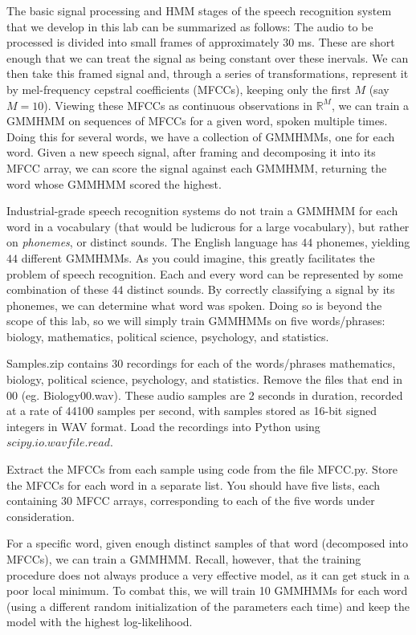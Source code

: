 The basic signal processing and HMM stages of the speech recognition system that we develop in this lab can be summarized as follows:
The audio to be processed is divided into small frames of approximately $30$ ms. These are short enough that we can treat the signal as being constant over these inervals. We can then take this framed signal and, through a series of transformations, represent it by mel-frequency cepstral coefficients (MFCCs), keeping only the first $M$ (say $M = 10$). Viewing these MFCCs as continuous observations in $\mathbb{R}^{M}$, we can train a GMMHMM on sequences of MFCCs for a given word, spoken multiple times. Doing this for several words, we have a collection of GMMHMMs, one for each word. Given a new speech signal, after framing and decomposing it into its MFCC array, we can score the signal against each GMMHMM, returning the word whose GMMHMM scored the highest.

Industrial-grade speech recognition systems do not train a GMMHMM for each word in a vocabulary (that would be ludicrous for a large vocabulary), but rather on \emph{phonemes}, or distinct sounds. The English language has $44$ phonemes, yielding $44$ different GMMHMMs. As you could imagine, this greatly facilitates the problem of speech recognition.  Each and every word can be represented by some combination of these $44$ distinct sounds.  By correctly classifying a signal by its phonemes, we can determine what word was spoken. Doing so is beyond the scope of this lab, so we will simply train GMMHMMs on five words/phrases: biology, mathematics, political science, psychology, and statistics.

\begin{problem}
Samples.zip contains 30 recordings for each of the words/phrases mathematics, biology, political science, psychology, and statistics. 
Remove the files that end in 00 (eg. Biology00.wav).
These audio samples are 2 seconds in
duration, recorded at a rate of 44100 samples per second, with samples stored as 16-bit signed
integers in WAV format. 
Load the recordings into Python using $scipy.io.wavfile.read$.

Extract the MFCCs from each sample using code from the file MFCC.py.
Store the MFCCs for each word in a separate list. 
You should have five lists, each containing
30 MFCC arrays, corresponding to each of the five words under consideration.
\end{problem}

For a specific word, given enough distinct samples of that word (decomposed into MFCCs), we can train a GMMHMM.
Recall, however, that the training procedure does not always produce a very effective model, as it can get stuck in a poor local minimum. 
To combat this, we will train 10 GMMHMMs for each word (using a different random initialization of the parameters each time)
and keep the model with the highest log-likelihood.

